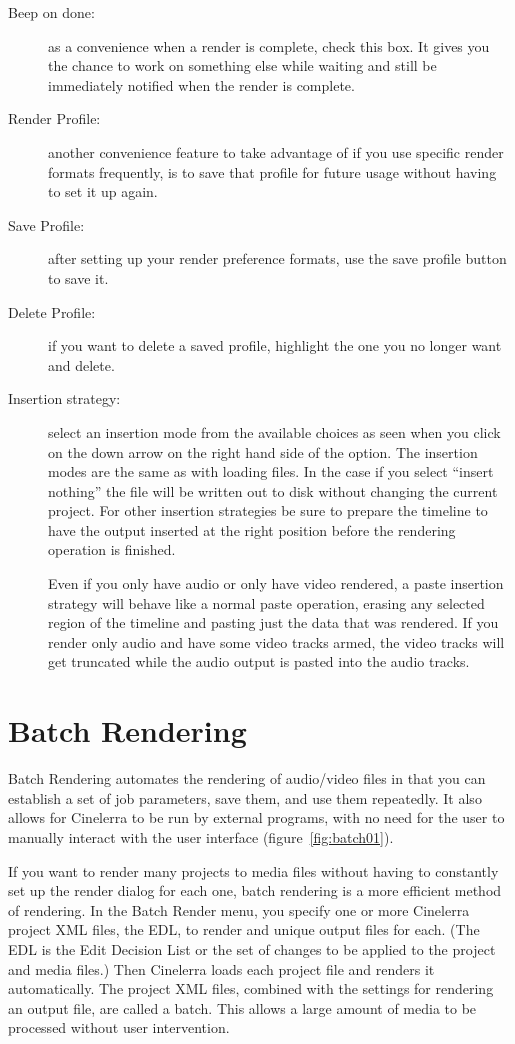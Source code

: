 \begin{description}
    \item[Beep on done:] as a convenience when a render is complete, check this box.  It gives you the chance to work on something else while waiting and still be immediately notified when the render is complete.
    \item[Render Profile:] another convenience feature to take advantage of if you use specific render formats
    frequently, is to save that profile for future usage without having to set it up again.
    \item[Save Profile:] after setting up your render preference formats, use the save profile button to save it.
    \item[Delete Profile:] if you want to delete a saved profile, highlight the one you no longer want and delete.
    \item[Insertion strategy:] select an insertion mode from the available choices as seen when you click on the down arrow on the right hand side of the option. The insertion modes are the same as with loading files.  In the case if you select “insert nothing” the file will be written out to disk without changing the current project. For other insertion strategies be sure to prepare the timeline to have the output inserted at the right position before the rendering operation is finished. 
    
    Even if you only have audio or only have video rendered, a paste insertion strategy will behave like a normal paste operation, erasing any selected region of the timeline and pasting just the data that was rendered.  If you render only audio and have some video tracks armed, the video tracks will get truncated while the audio output is pasted into the audio tracks.
\end{description}

\section{Batch Rendering}%
\label{sec:batch_rendering}

Batch Rendering automates the rendering of audio/video files in that you can establish a set of job parameters, save them, and use them repeatedly.  It also allows for Cinelerra to be run by external programs, with no need for the user to manually interact with the user interface (figure~\ref{fig:batch01}).

If you want to render many projects to media files without having to constantly set up the render dialog for each one, batch rendering is a more efficient method of rendering.  In the Batch Render menu, you specify one or more Cinelerra project XML files, the EDL, to render and unique output files for each. (The EDL is the Edit Decision List or the set of changes to be applied to the project and media files.) Then Cinelerra loads each project file and renders it automatically. The project XML files, combined with the settings for rendering an output file, are called a batch.  This allows a large amount of media to be processed without user intervention.

